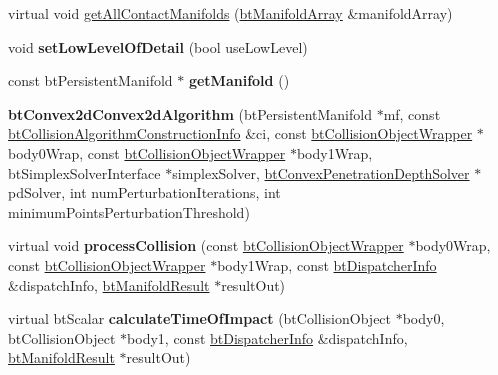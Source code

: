 \begin{DoxyCompactItemize}
virtual void \hyperlink{classbtConvex2dConvex2dAlgorithm_ade3af2f3f04d9b202535d33550a94be4}{get\+All\+Contact\+Manifolds} (\hyperlink{classbtAlignedObjectArray}{bt\+Manifold\+Array} \&manifold\+Array)
\item 
\mbox{\label{classbtConvex2dConvex2dAlgorithm_a287f00ab22f2a15215effc4f1f14f8a9}} 
void {\bfseries set\+Low\+Level\+Of\+Detail} (bool use\+Low\+Level)
\item 
\mbox{\label{classbtConvex2dConvex2dAlgorithm_a3db358838172c32e1fd075461ace5a58}} 
const bt\+Persistent\+Manifold $\ast$ {\bfseries get\+Manifold} ()
\item 
\mbox{\label{classbtConvex2dConvex2dAlgorithm_a5b8333581357811e17db88aa7380a315}} 
{\bfseries bt\+Convex2d\+Convex2d\+Algorithm} (bt\+Persistent\+Manifold $\ast$mf, const \hyperlink{structbtCollisionAlgorithmConstructionInfo}{bt\+Collision\+Algorithm\+Construction\+Info} \&ci, const \hyperlink{structbtCollisionObjectWrapper}{bt\+Collision\+Object\+Wrapper} $\ast$body0\+Wrap, const \hyperlink{structbtCollisionObjectWrapper}{bt\+Collision\+Object\+Wrapper} $\ast$body1\+Wrap, bt\+Simplex\+Solver\+Interface $\ast$simplex\+Solver, \hyperlink{classbtConvexPenetrationDepthSolver}{bt\+Convex\+Penetration\+Depth\+Solver} $\ast$pd\+Solver, int num\+Perturbation\+Iterations, int minimum\+Points\+Perturbation\+Threshold)
\item 
\mbox{\label{classbtConvex2dConvex2dAlgorithm_a67d1e9267d4f46de545632d006ebe2fd}} 
virtual void {\bfseries process\+Collision} (const \hyperlink{structbtCollisionObjectWrapper}{bt\+Collision\+Object\+Wrapper} $\ast$body0\+Wrap, const \hyperlink{structbtCollisionObjectWrapper}{bt\+Collision\+Object\+Wrapper} $\ast$body1\+Wrap, const \hyperlink{structbtDispatcherInfo}{bt\+Dispatcher\+Info} \&dispatch\+Info, \hyperlink{classbtManifoldResult}{bt\+Manifold\+Result} $\ast$result\+Out)
\item 
\mbox{\label{classbtConvex2dConvex2dAlgorithm_ad77f265aab30c12712c564c36630bc4f}} 
virtual bt\+Scalar {\bfseries calculate\+Time\+Of\+Impact} (bt\+Collision\+Object $\ast$body0, bt\+Collision\+Object $\ast$body1, const \hyperlink{structbtDispatcherInfo}{bt\+Dispatcher\+Info} \&dispatch\+Info, \hyperlink{classbtManifoldResult}{bt\+Manifold\+Result} $\ast$result\+Out)

\end{DoxyCompactItemize}
